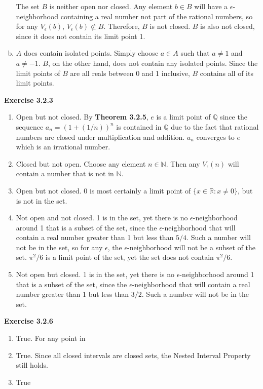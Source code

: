 \documentclass{article}
\begin{document}
\begin{enumerate}[(a)]
  The set \(B\) is neither open nor closed. Any element \(b \in B\) will have
  a \(\epsilon\)-neighborhood containing a real number not part of the rational
  numbers, so for any \(V_{\epsilon}(b)\), \(V_{\epsilon}(b) \not\subset B\). Therefore,
  \(B\) is not closed. \(B\) is also not closed, since it does not contain its limit
  point 1. 

\item \(A\) does contain isolated points. Simply choose \(a \in A\) such that \(a \neq 1\)
  and \(a \neq -1\). \(B\), on the other hand, does not contain any isolated points.
  Since the limit points of \(B\) are all reals between 0 and 1 inclusive, \(B\) contains
  all of its limit points.
  
\end{enumerate}
\textbf{Exercise 3.2.3}
\begin{enumerate}
\item Open but not closed. By \textbf{Theorem 3.2.5}, \(e\) is a limit point of \(\mathbb{Q}\)
  since the sequence \(a_{n} = (1 + (1 / n))^{n}\) is contained in \(\mathbb{Q}\)
  due to the fact that rational numbers are closed under multiplication and
  addition. \(a_{n}\) converges to \(e\) which is an irrational number. 
  
\item Closed but not open. Choose any element \(n \in \mathbb{N}\). Then any \(V_{\epsilon} (n)\)
  will contain a number that is not in \(\mathbb{N}\). 

\item Open but not closed. 0 is most certainly a limit point of \(\{x \in \mathbb{R} : x \neq 0\}\),
  but is not in the set.
  
\item Not open and not closed. 1 is in the set, yet there is no \(\epsilon\)-neighborhood
  around 1 that is a subset of the set, since the \(\epsilon\)-neighborhood that will
  contain a real number greater than 1 but less than \(5 / 4\). Such a number will not be in
  the set, so for any \(\epsilon\), the \(\epsilon\)-neighborhood will not be a subset of the
  set. \(\pi^{2} / 6\) is a limit point of the set, yet the set does not contain \(\pi^{2} / 6\). 

\item Not open but closed. 1 is in the set, yet there is no \(\epsilon\)-neighborhood
  around 1 that is a subset of the set, since the \(\epsilon\)-neighborhood that will
  contain a real number greater than 1 but less than \(3 / 2\). Such a number will not be in
  the set. 

\end{enumerate}
\textbf{Exercise 3.2.6}
\begin{enumerate}
\item True. For any point in 
\item True. Since all closed intervals are closed sets, the Nested Interval Property
  still holds. 
\item True

  
\end{enumerate}
\end{document}
